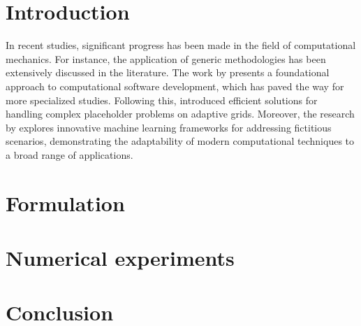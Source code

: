 \section{Introduction}
In recent studies, significant progress has been made in the field of computational mechanics. For instance, the application of generic methodologies has been extensively discussed in the literature. The work by \citet{LoremIpsum2015a} presents a foundational approach to computational software development, which has paved the way for more specialized studies. Following this, \citet{LoremIpsum2023a} introduced efficient solutions for handling complex placeholder problems on adaptive grids. Moreover, the research by \citet{LoremIpsum2023b} explores innovative machine learning frameworks for addressing fictitious scenarios, demonstrating the adaptability of modern computational techniques to a broad range of applications.

\section{Formulation}
\section{Numerical experiments}
\section{Conclusion}